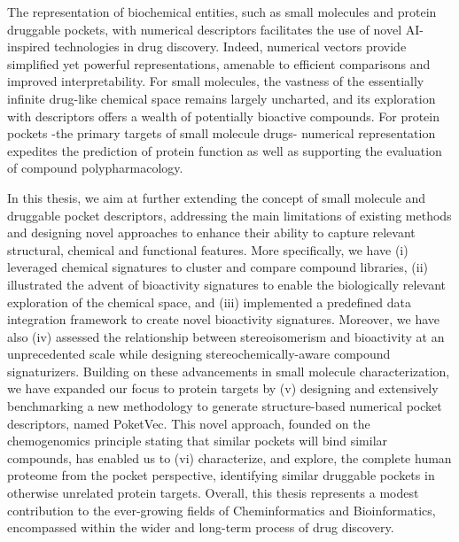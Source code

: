 
The representation of biochemical entities, such as small molecules and protein druggable pockets, with numerical descriptors facilitates the use of novel AI-inspired technologies in drug discovery. Indeed, numerical vectors provide simplified yet powerful representations, amenable to efficient comparisons and improved interpretability. For small molecules, the vastness of the essentially infinite drug-like chemical space remains largely uncharted, and its exploration with descriptors offers a wealth of potentially bioactive compounds. For protein pockets -the primary targets of small molecule drugs- numerical representation expedites the prediction of protein function as well as supporting the evaluation of compound polypharmacology.  

In this thesis, we aim at further extending the concept of small molecule and druggable pocket descriptors, addressing the main limitations of existing methods and designing novel approaches to enhance their ability to capture relevant structural, chemical and functional features. More specifically, we have (i) leveraged chemical signatures to cluster and compare compound libraries, (ii) illustrated the advent of bioactivity signatures to enable the biologically relevant exploration of the chemical space, and (iii) implemented a predefined data integration framework to create novel bioactivity signatures. Moreover, we have also (iv) assessed the relationship between stereoisomerism and bioactivity at an unprecedented scale while designing stereochemically-aware compound signaturizers. Building on these advancements in small molecule characterization, we have expanded our focus to protein targets by (v) designing and extensively benchmarking a new methodology to generate structure-based numerical pocket descriptors, named PoketVec. This novel approach, founded on the chemogenomics principle stating that similar pockets will bind similar compounds, has enabled us to (vi) characterize, and explore, the complete human proteome from the pocket perspective, identifying similar druggable pockets in otherwise unrelated protein targets. Overall, this thesis represents a modest contribution to the ever-growing fields of Cheminformatics and Bioinformatics, encompassed within the wider and long-term process of drug discovery. 